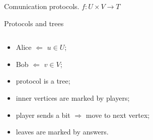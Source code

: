 \begin{frame}{Comunication protocols. $f\colon U \times V \to T$}
    \begin{center}
    	    
    \end{center}

    \pause
    \pause
    \pause
\end{frame}

\begin{frame}{Protocols and trees}


    \begin{columns}[t]
		\begin{column}{0.55\textwidth}
            \begin{itemize}
                \item Alice $\Leftarrow$ $u \in U$;
                \item Bob $\Leftarrow$ $v \in V$;
                \item protocol is a tree;
                \item<2-> inner vertices are marked by players;
	            \item<3-> player sends a bit $\Rightarrow$ move to next vertex;
    		    \item<8-> leaves are marked by answers.
	        \end{itemize}
        \end{column}
		\begin{column}{0.25\textwidth}
            
		\end{column}
	\end{columns}

\end{frame}



